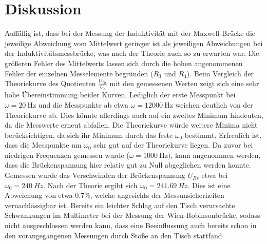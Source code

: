 \section{Diskussion}
\label{sec:Diskussion}
Auffällig ist, dass bei der Messung der Induktivität mit der Maxwell-Brücke die jeweilige Abweichung vom Mittelwert geringer ist als jeweiligen Abweichungen bei der Induktivitätsmessbrücke, was nach der Theorie auch so zu erwarten war.
Die größeren Fehler des Mittelwerts lassen sich durch die hohen angenommenen Fehler der einzelnen Messelemente begründen ($R_3$ und $R_4$).
Beim Vergleich der Theoriekurve des Quotienten $\frac{U_{Br}}{U_s}$ mit den gemessenen Werten zeigt sich eine sehr hohe Übereinstimmung beider Kurven. Lediglich der erste Messpunkt
bei $\omega=\SI{20}{\Hz}$ und die Messpunkte ab etwa $\omega=\SI{12000}{\Hz}$ weichen deutlich von der Theoriekurve ab. Dies könnte allerdings auch auf ein zweites Minimum hindeuten, da die Messwerte erneut abfallen. Die Theoriekurve würde weitere Minima nicht berücksichtigen, da sich ihr Minimum durch das feste $\omega_0$ bestimmt.
Erfreulich ist, dass die Messpunkte um $\omega_0$ sehr gut auf der Theoriekurve liegen.
Da zuvor bei niedrigen Frequenzen gemessen wurde ($\omega=\SI{1000}{\Hz})$, kann angenommen werden, dass die Brückenspannung hier relativ gut zu Null abgeglichen werden konnte. Gemessen wurde das Verschwinden der Brückenspannung
$U_{Br}$ etwa bei $\omega_0=\SI{240}{Hz}$. Nach der Theorie ergibt sich $\omega_0=\SI{241.69}{Hz}$. Dies ist eine Abweichung von etwa $0.7\%$, welche angesichts der Messunsicherheiten vernachlässigbar ist.
Bereits ein leichter Schlag auf den Tisch verursachte Schwankungen im Multimeter bei der Messung der Wien-Robinsonbrücke, sodass nicht ausgeschlossen werden kann, dass eine Beeinflussung auch bereits schon in den vorangegangenen Messungen durch Stöße an den Tisch stattfand.
